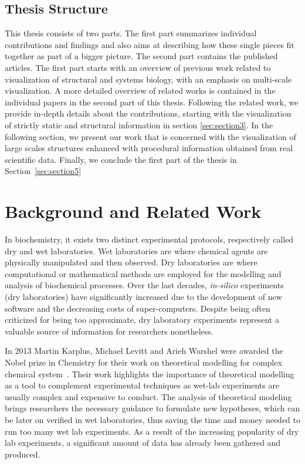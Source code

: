 \subsection{Thesis Structure}

This thesis consists of two parts.
The first part summarizes individual contributions and findings and also aims at describing how these single pieces fit together as part of a bigger picture.
The second part contains the published articles.
The first part starts with an overview of previous work related to visualization of structural and systems biology, with an emphasis on multi-scale visualization. 
A more detailed overview of related works is contained in the individual papers in the second part of this thesis. 
Following the related work, we provide in-depth details about the contributions, starting with the visualization of strictly static and structural information in section \ref{sec:section3}.
In the following section, we present our work that is concerned with the visualization of large scales structures enhanced with procedural information obtained from real scientific data. 
Finally, we conclude the first part of the thesis in Section~\ref{sec:section5}

\section{Background and Related Work}

In biochemistry, it exists two distinct experimental protocols, respectively called dry and wet laboratories.
Wet laboratories are where chemical agents are physically manipulated and then observed.
Dry laboratories are where computational or mathematical methods are employed for the modelling and analysis of biochemical processes. 
Over the last decades, \textit{in-silico} experiments (dry laboratories) have significantly increased due to the development of new software and the decreasing costs of super-computers.
Despite being often criticized for being too approximate, dry laboratory experiments represent a valuable source of information for researchers nonetheless.

In 2013 Martin Karplus, Michael Levitt and Arieh Warshel were awarded the Nobel prize in Chemistry for their work on theoretical modelling for complex chemical system~\cite{karplus2014development}.
Their work highlights the importance of theoretical modelling as a tool to complement experimental techniques as wet-lab experiments are usually complex and expensive to conduct.
The analysis of theoretical modeling brings researchers the necessary guidance to formulate new hypotheses, which can be later on verified in wet laboratories, thus saving the time and money needed to run too many wet lab experiments.
As a result of the increasing popularity of dry lab experiments, a significant amount of data has already been gathered and produced.

